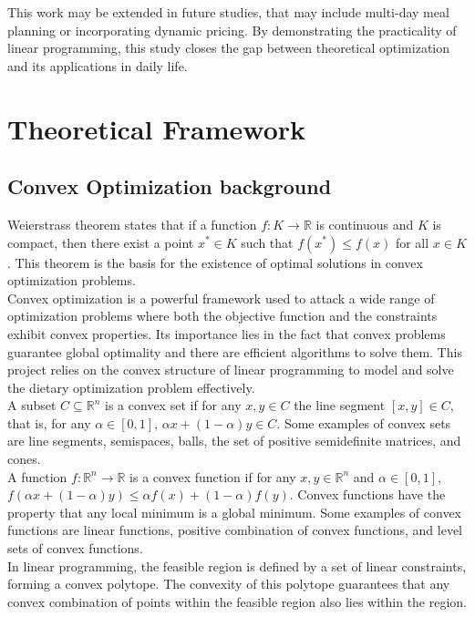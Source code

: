 \documentclass[10pt]{article}
\begin{document}
This work may be extended in future studies, that may include multi-day meal planning or incorporating dynamic pricing. By demonstrating the practicality of linear programming, this study closes the gap between theoretical optimization and its applications in daily life.

\section{Theoretical Framework}

\subsection{Convex Optimization background}

Weierstrass theorem states that if a function $f: K \rightarrow \mathbb{R}$ is continuous and $K$ is compact, then there exist a point $x^* \in K$ such that $f(x^*) \leq f(x)$ for all $x \in K$. This theorem is the basis for the existence of optimal solutions in convex optimization problems.\\

Convex optimization is a powerful framework used to attack a wide range of optimization problems where both the objective function and the constraints exhibit convex properties. Its importance lies in the fact that convex problems guarantee global optimality and there are efficient algorithms to solve them. This project relies on the convex structure of linear programming to model and solve the dietary optimization problem effectively.\\

A subset $C \subseteq \mathbb{R}^n$ is a convex set if for any $x, y \in C$ the line segment $[x,y] \in C$, that is, for any $\alpha \in [0,1]$, $\alpha x + (1-\alpha)y \in C$. Some examples of convex sets are line segments, semispaces, balls, the set of positive semidefinite matrices, and cones.\\

A function $f: \mathbb{R}^n \rightarrow \mathbb{R}$ is a convex function if for any $x, y \in \mathbb{R}^n$ and $\alpha \in [0,1]$, $f(\alpha x + (1-\alpha)y) \leq \alpha f(x) + (1-\alpha)f(y)$. Convex functions have the property that any local minimum is a global minimum. Some examples of convex functions are linear functions, positive combination of convex functions, and level sets of convex functions.\\

In linear programming, the feasible region is defined by a set of linear constraints, forming a convex polytope. The convexity of this polytope guarantees that any convex combination of points within the feasible region also lies within the region.\\
\end{document}
